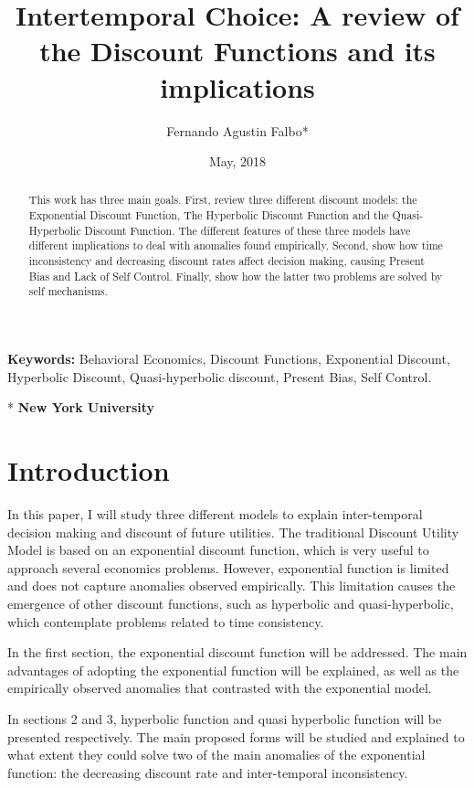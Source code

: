 \documentclass[]{article}
\title{Intertemporal Choice: A review of the Discount Functions and its implications}
\author{Fernando Agustin Falbo*}
\date{May, 2018}
\begin{document}
\maketitle
\begin{abstract}
This work has three main goals. First, review three different discount models: the Exponential Discount Function, The Hyperbolic Discount Function and the Quasi-Hyperbolic Discount Function. The different features of these three models have different implications to deal with anomalies found empirically. Second, show how time inconsistency and decreasing discount rates affect decision making, causing Present Bias and Lack of Self Control. Finally, show how the latter two problems are solved by self mechanisms.
\end{abstract}

\textbf{Keywords: }Behavioral Economics, Discount Functions, Exponential Discount, Hyperbolic Discount, Quasi-hyperbolic discount, Present Bias, Self Control.

\vspace*{3ex}

* \textbf{New York University}

\pagebreak

\hypertarget{introduction}{%
\section{Introduction}\label{introduction}}

In this paper, I will study three different models to explain inter-temporal decision making and discount of future utilities. The traditional Discount Utility Model is based on an exponential discount function, which is very useful to approach several economics problems. However, exponential function is limited and does not capture anomalies observed empirically. This limitation causes the emergence of other discount functions,
such as hyperbolic and quasi-hyperbolic, which contemplate problems related to time consistency.

In the first section, the exponential discount function will be addressed. The main advantages of adopting the exponential function will be explained, as well as the empirically observed anomalies that contrasted with the exponential model.

In sections 2 and 3, hyperbolic function and quasi hyperbolic function will be presented respectively. The main proposed forms will be studied and explained to what extent they could solve two of the main anomalies of the exponential function: the decreasing discount rate and inter-temporal inconsistency.
\end{document}
